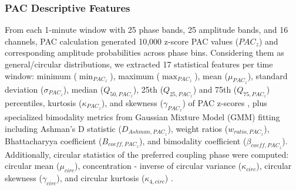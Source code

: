 


  
\subsubsection{PAC Descriptive Features}

From each 1-minute window with 25 phase bands, 25 amplitude bands, and 16 channels, PAC calculation generated 10,000 z-score PAC values (${PAC}_z$) and corresponding amplitude probabilities across phase bins. Considering them as general/circular distributions, we extracted 17 statistical features per time window: minimum ($\min_{{PAC}_z}$), maximum ($\max_{{PAC}_z}$), mean ($\mu_{{PAC}_z}$), standard deviation ($\sigma_{{PAC}_z}$), median ($Q_{50,{PAC}_z}$), 25th ($Q_{25,{PAC}_z}$) and 75th ($Q_{75,{PAC}_z}$) percentiles, kurtosis ($\kappa_{{PAC}_z}$), and skewness ($\gamma_{{PAC}_z}$) of PAC z-scores \cite{Hlsemann2019QuantificationOPA,Scherer2022DirectMIM}, plus specialized bimodality metrics from Gaussian Mixture Model (GMM) fitting including Ashman's D statistic ($D_{Ashman,{PAC}_z}$), weight ratios ($w_{ratio,{PAC}_z}$), Bhattacharyya coefficient ($B_{coeff,{PAC}_z}$), and bimodality coefficient ($\beta_{coeff,{PAC}_z}$). Additionally, circular statistics of the preferred coupling phase were computed: circular mean ($\mu_{circ}$), concentration - inverse of circular variance ($\kappa_{circ}$), circular skewness ($\gamma_{circ}$), and circular kurtosis ($\kappa_{4,circ}$) \cite{PintoOrellana2023StatisticalIFF}.

